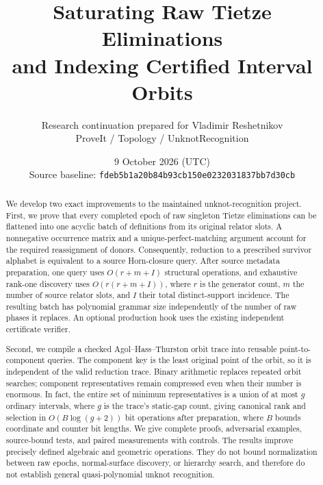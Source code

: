 \documentclass[11pt]{article}
\title{\color{ink}\bfseries Saturating Raw Tietze Eliminations\\[3pt]
  and Indexing Certified Interval Orbits}
\author{Research continuation prepared for Vladimir Reshetnikov\\
  \small ProveIt / Topology / UnknotRecognition}
\date{9 October 2026 (UTC)\\
  \small Source baseline: \texttt{fdeb5b1a20b84b93cb150e0232031837bb7d30cb}}
\theoremstyle{definition}
\theoremstyle{remark}
\begin{document}
\maketitle
\begin{abstract}
We develop two exact improvements to the maintained unknot-recognition
project. First, we prove that every completed epoch of raw singleton
Tietze eliminations can be flattened into one acyclic batch of definitions
from its original relator slots. A nonnegative occurrence matrix and a
unique-perfect-matching argument account for the required reassignment of
donors. Consequently, reduction to a prescribed survivor alphabet is
equivalent to a source Horn-closure query. After source metadata preparation,
one query uses $O(r+m+I)$ structural operations, and exhaustive rank-one
discovery uses $O(r(r+m+I))$, where $r$ is the generator count, $m$ the
number of source relator slots, and $I$ their total distinct-support
incidence. The resulting batch has polynomial grammar size independently
of the number of raw phases it replaces. An optional production hook uses
the existing independent certificate verifier.

Second, we compile a checked Agol--Hass--Thurston orbit trace into reusable
point-to-component queries. The component key is the least original point
of the orbit, so it is independent of the valid reduction trace. Binary
arithmetic replaces repeated orbit searches; component representatives
remain compressed even when their number is enormous. In fact, the entire
set of minimum representatives is a union of at most $g$ ordinary intervals,
where $g$ is the trace's static-gap count, giving canonical rank and selection
in $O(B\log(g+2))$ bit operations after preparation, where $B$ bounds
coordinate and counter bit lengths. We give complete
proofs, adversarial examples, source-bound tests, and paired measurements
with controls. The results improve precisely defined algebraic and
geometric operations. They do not bound normalization between raw epochs,
normal-surface discovery, or hierarchy search, and therefore do not
establish general quasi-polynomial unknot recognition.
\end{abstract}

\begin{center}
\end{center}
\tableofcontents
\newpage







\appendix


\end{document}
